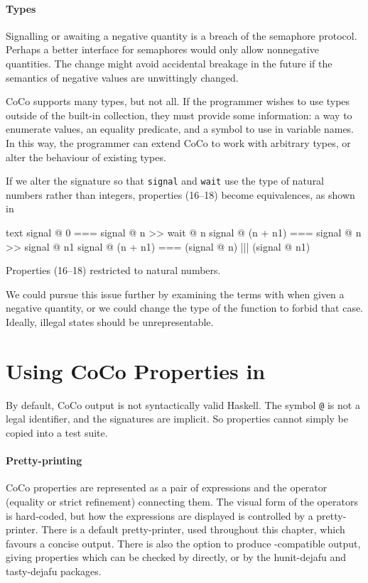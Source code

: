 \paragraph{Types}
Signalling or awaiting a negative quantity is a breach of the
semaphore protocol.  Perhaps a better interface for semaphores would
only allow nonnegative quantities.  The change might avoid accidental
breakage in the future if the semantics of negative values are
unwittingly changed.

CoCo supports many types, but not all.  If the programmer wishes to
use types outside of the built-in collection, they must provide some
information: a way to enumerate values, an equality predicate, and a
symbol to use in variable names.  In this way, the programmer can
extend CoCo to work with arbitrary types, or alter the behaviour of
existing types.

If we alter the signature so that \verb|signal| and \verb|wait| use
the type of natural numbers rather than integers, properties (16--18)
become equivalences, as shown in 

\begin{listing}
\centering
\begin{cminted}{text}
       signal @ 0  ===  signal @ n >> wait @ n
signal @ (n + n1)  ===  signal @ n >> signal @ n1
signal @ (n + n1)  ===  (signal @ n) ||| (signal @ n1)
\end{cminted}
\caption{Properties (16--18) restricted to natural numbers.}\label{lst:sem4}
\end{listing}

We could pursue this issue further by examining the terms with
\dejafu{} when given a negative quantity, or we could change the type
of the function to forbid that case.  Ideally, illegal states should
be unrepresentable.

\section{Using CoCo Properties in \dejafu{}}
\label{sec:coco-dejafu}

By default, CoCo output is not syntactically valid Haskell.  The
symbol \texttt{@} is not a legal identifier, and the signatures are
implicit.  So properties cannot simply be copied into a test suite.

\paragraph{Pretty-printing}
CoCo properties are represented as a pair of expressions and the
operator (equality or strict refinement) connecting them.  The visual
form of the operators is hard-coded, but how the expressions are
displayed is controlled by a pretty-printer.  There is a default
pretty-printer, used throughout this chapter, which favours a concise
output.  There is also the option to produce \dejafu{}-compatible
output, giving properties which can be checked by \dejafu{} directly,
or by the hunit-dejafu\cite{hunit_dejafu} and
tasty-dejafu\cite{tasty_dejafu} packages.

